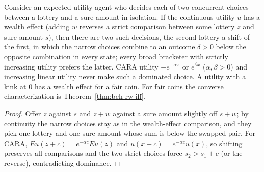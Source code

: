 \begin{theorem}
\label{thm:beh-rabin-weizsacker}
\leanok
Consider an expected-utility agent who decides each of two concurrent choices between a lottery and a sure amount in
isolation. If the continuous utility $u$ has a wealth effect (adding $w$ reverses a strict comparison between some
lottery $z$ and sure amount $s$), then there are two such decisions, the second lottery a shift of the first, in which
the narrow choices combine to an outcome $\delta>0$ below the opposite combination in every state; every broad bracketer
with strictly increasing utility prefers the latter. CARA utility $-e^{-\alpha x}$ or $e^{\beta x}$ ($\alpha,\beta>0$) and increasing linear utility never make such a
dominated choice. A utility with a kink at $0$ has a wealth effect for a fair coin. For fair coins the converse
characterization is Theorem~\ref{thm:beh-rw-iff}.
\end{theorem}
\begin{proof}
\leanok
Offer $z$ against $s$ and $z+w$ against a sure amount slightly off $s+w$; by continuity the narrow choices stay as in
the wealth-effect comparison, and they pick one lottery and one sure amount whose sum is below the swapped pair. For CARA,
$E u(z+c)=e^{-\alpha c}E u(z)$ and $u(x+c)=e^{-\alpha c}u(x)$, so shifting preserves all comparisons and the two strict
choices force $s_2>s_1+c$ (or the reverse), contradicting dominance.
\end{proof}

